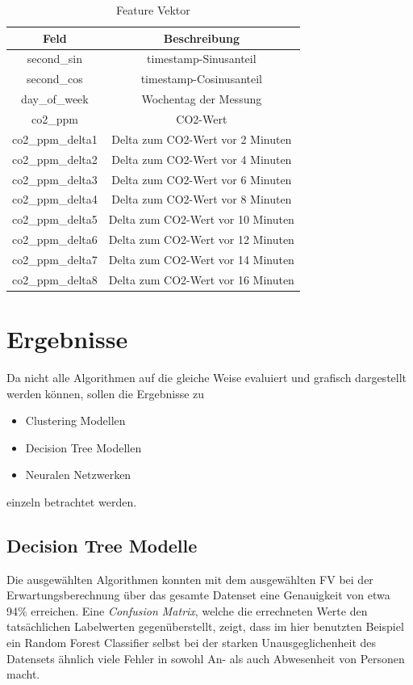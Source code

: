 \begin{center}
    \begin{table}[h]
        \centering
        \caption{Feature Vektor}
        \begin{tabular}{ |c||c| } 
        \hline
        Feld & Beschreibung \\ 
        \hline\hline
        second\_sin & timestamp-Sinusanteil\\
        second\_cos & timestamp-Cosinusanteil\\
        day\_of\_week & Wochentag der Messung\\
        co2\_ppm & CO2-Wert\\ 
        co2\_ppm\_delta1 & Delta zum CO2-Wert vor 2 Minuten\\ 
        co2\_ppm\_delta2 & Delta zum CO2-Wert vor 4 Minuten\\ 
        co2\_ppm\_delta3 & Delta zum CO2-Wert vor 6 Minuten\\ 
        co2\_ppm\_delta4 & Delta zum CO2-Wert vor 8 Minuten\\ 
        co2\_ppm\_delta5 & Delta zum CO2-Wert vor 10 Minuten\\ 
        co2\_ppm\_delta6 & Delta zum CO2-Wert vor 12 Minuten\\ 
        co2\_ppm\_delta7 & Delta zum CO2-Wert vor 14 Minuten\\ 
        co2\_ppm\_delta8 & Delta zum CO2-Wert vor 16 Minuten\\ 
        \hline
        \end{tabular}
    \end{table}
\end{center}

\newpage

\section{Ergebnisse}
Da nicht alle Algorithmen auf die gleiche Weise evaluiert und grafisch dargestellt werden können, sollen 
die Ergebnisse zu 
\begin{itemize}
    \item Clustering Modellen
    \item Decision Tree Modellen
    \item Neuralen Netzwerken
\end{itemize}
einzeln betrachtet werden.

\subsection{Decision Tree Modelle}
Die ausgewählten Algorithmen konnten mit dem ausgewählten FV bei der Erwartungsberechnung über das gesamte 
Datenset eine Genauigkeit von etwa 94\% erreichen. Eine \textit{Confusion Matrix}, welche die errechneten 
Werte den tatsächlichen Labelwerten gegenüberstellt, zeigt, dass im hier benutzten Beispiel ein Random Forest Classifier 
selbst bei der starken Unausgeglichenheit des Datensets ähnlich viele Fehler in sowohl An- als auch Abwesenheit 
von Personen macht.

